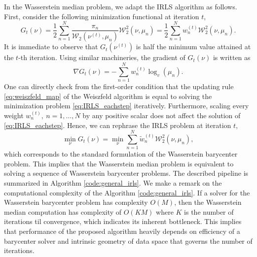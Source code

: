 \documentclass[11pt]{article}
\newcommand{\calW}{\mathcal{W}}
\begin{document}
In the Wasserstein median problem, we adapt the IRLS algorithm as follows. First, consider the following minimization functional at iteration $t$,
\begin{equation}\label{eq:IRLS_eachstep}
	G_t(\nu) =  \frac{1}{2}\sum_{n=1}^N \frac{\pi_n}{\calW_2 (\nu^{(t)}, \mu_n)} \calW_2^2 (\nu, \mu_n) = \frac{1}{2} \sum_{n=1}^N {w_n^{(t)}} \calW_2^2 (\nu, \mu_n).
\end{equation}
It is immediate to observe  that $G_t (\nu^{(t)})$ is half the minimum value attained at the $t$-th iteration. Using similar machineries, the gradient of $G_t (\nu)$ is written as 
\begin{equation*}
	\nabla G_t (\nu) = - \sum_{n=1}^N w_n^{(t)} \log_v (\mu_n).
\end{equation*}
One can directly check from the first-order condition that the updating rule \eqref{eq:weiszfeld_map} of the Weiszfeld algorithm is equal to solving the minimization problem \eqref{eq:IRLS_eachstep} iteratively. Furthermore, scaling every weight $w_n^{(t)},~n=1,\ldots,N$ by any positive scalar does not affect the solution of \eqref{eq:IRLS_eachstep}. Hence, we can rephrase the IRLS problem at iteration $t$,
\begin{equation}\label{eq:IRLS_subproblem}
	\min_{\nu}	G_t (\nu) = \min_{\nu} \sum_{n=1}^N \tilde{w}_n^{(t)} \calW_2^2 (\nu, \mu_n),
\end{equation}
which corresponds to the standard formulation of the Wasserstein barycenter problem. This implies that the Wasserstein median problem is equivalent to solving a sequence of Wasserstein barycenter problems. The described pipeline is summarized in Algorithm \ref{code:general_irls}. We make a remark on the computational complexity of the Algorithm \ref{code:general_irls}. If a solver for the Wasserstein barycenter problem has complexity $O(M)$, then the Wasserstein median computation has complexity of $O(KM)$ where $K$ is the number of iterations til convergence, which indicates its inherent bottleneck. This implies that performance of the proposed algorithm heavily depends on efficiency of a barycenter solver and intrinsic geometry of data space that governs the number of iterations.
\end{document}
